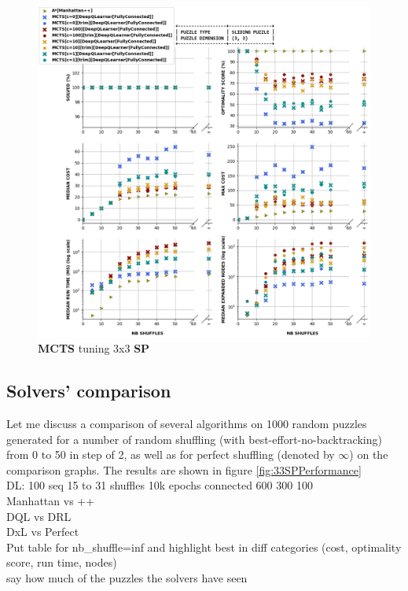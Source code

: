 \begin{figure}[H]
\centering
\includegraphics[align=c, scale=0.6]{./Figures/33SPPerformanceMCTS}
\caption[33SPPerformanceMCTS]{\textbf{MCTS} tuning 3x3 \textbf{SP}}
\label{fig:33SPPerformanceMCTS}
\end{figure}



\subsection{Solvers' comparison}
\label{ssec:33SPSC}
\label{sec:S33DRLDQL}
Let me discuss a comparison of several algorithms on 1000 random puzzles generated for a number of random shuffling (with best-effort-no-backtracking) from 0 to 50 in step of 2, as well as for perfect shuffling (denoted by $\infty$) on the comparison graphs. The results are shown in figure \ref{fig:33SPPerformance}
\\
DL: 100 seq 15 to 31 shuffles 10k epochs connected 600 300 100
\\
Manhattan vs ++
\\
DQL vs DRL
\\
DxL vs Perfect
\\ Put table for nb\_shuffle=inf and highlight best in diff categories (cost, optimality score, run time, nodes)
\\ say how much of the puzzles the solvers have seen



